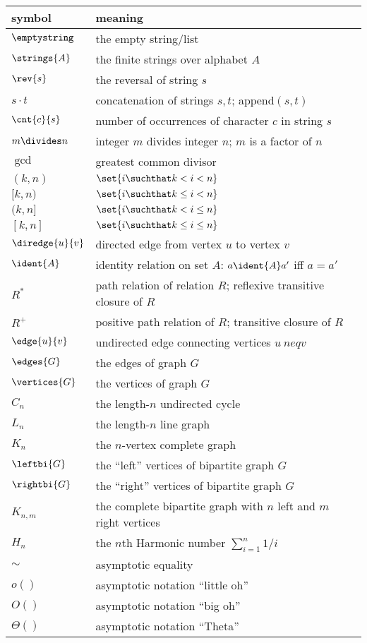 \begin{center}
\begin{tabular}{ll}
symbol         &  meaning\\
\hline
$\emptystring$ & the empty string/list\\
$\strings{A}$  & the finite strings over alphabet $A$\\
$\rev{s}$      & the reversal of string $s$\\
$s \cdot t$    & concatenation of strings $s,t$; $\text{append}(s,t)$\\
$\cnt{c}{s}$   & number of occurrences of character $c$ in string $s$\\
$m \divides n$ & integer $m$ divides integer $n$; $m$ is a factor of $n$\\
$\gcd{}{}$     & greatest common divisor\\
$(k, n)$       & $\set{i \suchthat k < i < n}$\\
$[k, n)$       & $\set{i \suchthat k \le i < n}$\\
$(k, n]$       & $\set{i \suchthat k < i \le n}$\\
$[k,n]$        & $\set{i \suchthat k \le i \le n}$\\
$\diredge{u}{v}$ & directed edge from vertex $u$ to vertex $v$\\
$\ident{A}$    & identity relation on set $A$: $a \ident{A} a'$ iff $a = a'$\\
$R^*$          & path relation of relation $R$; reflexive transitive closure of $R$\\
$R^+$          & positive path relation of $R$; transitive closure of $R$\\
$\edge{u}{v}$  & undirected edge connecting vertices $u\ neq v$\\
$\edges{G}$    & the edges of graph $G$\\
$\vertices{G}$ & the vertices of graph $G$\\
$C_n$          & the length-$n$ undirected cycle\\
$L_n$          & the length-$n$ line graph\\
$K_n$          & the $n$-vertex complete graph\\
$\leftbi{G}$   & the ``left'' vertices of bipartite graph $G$\\
$\rightbi{G}$  & the ``right'' vertices of bipartite graph $G$\\
$K_{n,m}$       & the complete bipartite graph with $n$ left and $m$ right vertices\\
$H_n$          & the $n$th Harmonic number $\sum_{i=1}^n 1/i$\\
$\sim$         & asymptotic equality\\
$o()$          & asymptotic notation ``little oh''\\
$O()$          & asymptotic notation ``big oh''\\
$\Theta()$     & asymptotic notation ``Theta''

\end{tabular}
\end{center}
